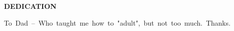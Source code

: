 \pagebreak
\begin{center}{\large\bf DEDICATION\\}\end{center}
\vspace*{1in}
\begin{center}
\mbox{To Dad -- Who taught me how to "adult", but not too much. Thanks.}
\end{center}
\pagebreak

